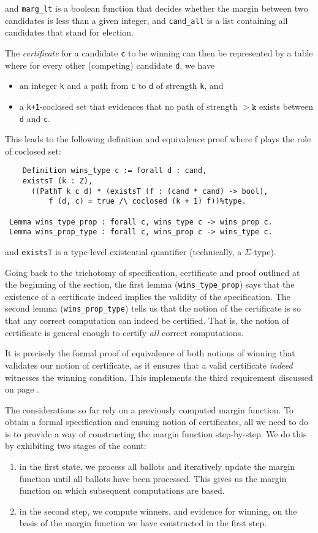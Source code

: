 \documentclass{llncs}
\begin{document}
\noindent
and \texttt{marg\_lt} is a boolean function that decides whether the
margin between two candidates is less than a given integer, and
\texttt{cand\_all} is a list containing all candidates that stand
for election.

The \emph{certificate} for a candidate \texttt{c} to be winning can then be
represented by a table where for every other (competing) candidate
\texttt{d}, we have
\begin{itemize}
\item an integer \texttt{k} and a path from \texttt{c} to \texttt{d}
of strength \texttt{k}, and
\item a \texttt{k+1}-coclosed set that evidences that no path of
strength $> \mathtt{k}$ exists between \texttt{d} and \texttt{c}.
\end{itemize}
This leads to the following definition and equivalence proof where
f plays the role of coclosed set:
\begin{verbatim}   
	Definition wins_type c := forall d : cand, 
    existsT (k : Z), 
      ((PathT k c d) * (existsT (f : (cand * cand) -> bool),       
	      f (d, c) = true /\ coclosed (k + 1) f))%type.

 Lemma wins_type_prop : forall c, wins_type c -> wins_prop c.  
 Lemma wins_prop_type : forall c, wins_prop c -> wins_type c.
\end{verbatim}

\noindent
and \texttt{existsT} is a type-level existential quantifier
(technically, a $\Sigma$-type).

Going back to the trichotomy of specification, certificate and
proof outlined at the beginning of the section, the first lemma
(\texttt{wins\_type\_prop}) says that the existence of a certificate
indeed implies the validity of the specification. The second lemma
(\texttt{wins\_prop\_type}) tells us that the notion of the
certificate is so that any correct computation can indeed be
certified. That is, the notion of certificate is general enough to
certify \emph{all} correct computations. 

It is precisely the formal proof of equivalence of both notions of
winning that validates our notion of certificate, as it ensures that
a valid certificate \emph{indeed} witnesses the winning condition.
This implements the third requirement discussed on page
\pageref{it:coherence}.

The considerations so far rely on a previously computed margin
function. To obtain a formal specification and ensuing notion of
certificates, all we need to do is to provide a way of constructing
the margin function step-by-step. We do this by exhibiting two
stages of the count:
\begin{enumerate}
  \item in the first state, we process all ballots and iteratively update the
margin function  until all ballots have been processed. This gives
us the margin function on which subsequent computations are based.
  \item in the second step, we compute winners, and evidence for
winning, on the basis of the margin function we have constructed in
the first step.
\end{enumerate}
\end{document}
